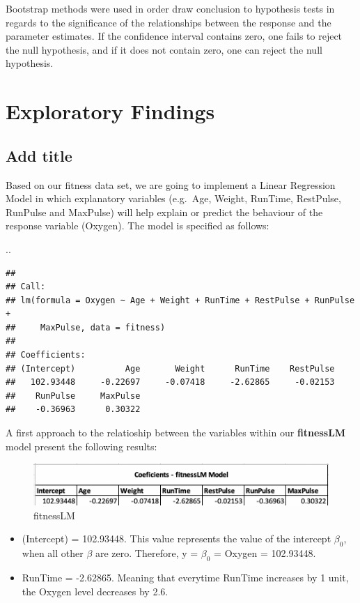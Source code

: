 \documentclass[]{article}
\begin{document}
Bootstrap methods were used in order draw conclusion to hypothesis tests
in regards to the significance of the relationships between the response
and the parameter estimates. If the confidence interval contains zero,
one fails to reject the null hypothesis, and if it does not contain
zero, one can reject the null hypothesis.

\section{Exploratory Findings}\label{exploratory-findings}

\subsection{Add title}\label{add-title}

Based on our fitness data set, we are going to implement a Linear
Regression Model in which explanatory variables (e.g.~Age, Weight,
RunTime, RestPulse, RunPulse and MaxPulse) will help explain or predict
the behaviour of the response variable (Oxygen). The model is specified
as follows:

..

\begin{verbatim}
## 
## Call:
## lm(formula = Oxygen ~ Age + Weight + RunTime + RestPulse + RunPulse + 
##     MaxPulse, data = fitness)
## 
## Coefficients:
## (Intercept)          Age       Weight      RunTime    RestPulse  
##   102.93448     -0.22697     -0.07418     -2.62865     -0.02153  
##    RunPulse     MaxPulse  
##    -0.36963      0.30322
\end{verbatim}

A first approach to the relatioship between the variables within our
\textbf{fitnessLM} model present the following results:

\begin{figure}
\centering
\includegraphics{images/1_fitnessLM_sum.png}
\caption{fitnessLM}
\end{figure}

\begin{itemize}
\item
  (Intercept) = 102.93448. This value represents the value of the
  intercept \(\beta_0\),\\
  when all other \(\beta\) are zero. Therefore, y = \(\beta_0\) = Oxygen
  = 102.93448.
\item
  RunTime = -2.62865. Meaning that everytime RunTime increases by 1
  unit, the Oxygen level decreases by 2.6.
\end{itemize}
\end{document}
